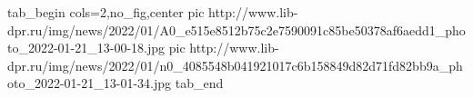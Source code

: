  
 
 
 
 


\ifcmt
  tab_begin cols=2,no_fig,center
     pic http://www.lib-dpr.ru/img/news/2022/01/A0_e515e8512b75c2e7590091c85be50378af6aedd1_photo_2022-01-21_13-00-18.jpg
		 pic http://www.lib-dpr.ru/img/news/2022/01/n0_4085548b041921017c6b158849d82d71fd82bb9a_photo_2022-01-21_13-01-34.jpg
  tab_end
\fi
